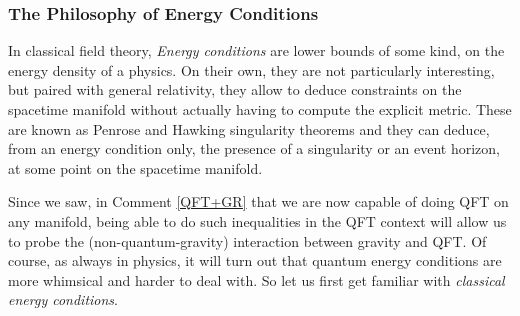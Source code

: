 \documentclass[a4paper,11pt]{article}
\numberwithin{equation}{section}
\theoremstyle{definition}
\begin{document}
\subsubsection{The Philosophy of Energy Conditions}
In classical field theory, \emph{Energy conditions} are lower bounds of some kind, on the energy density of a physics. On their own, they are not particularly interesting, but paired with general relativity, they allow to deduce constraints on the spacetime manifold without actually having to compute the explicit metric. These are known as Penrose and Hawking singularity theorems \cite{SingTheo} and they can deduce, from an energy condition only, the presence of a singularity or an event horizon, at some point on the spacetime manifold. 

Since we saw, in Comment \ref{QFT+GR} that we are now capable of doing QFT on any manifold, being able to do such inequalities in the QFT context will allow us to probe the (non-quantum-gravity) interaction between gravity and QFT. Of course, as always in physics, it will turn out that quantum energy conditions are more whimsical and harder to deal with. So let us first get familiar with \emph{classical energy conditions}.
\end{document}
